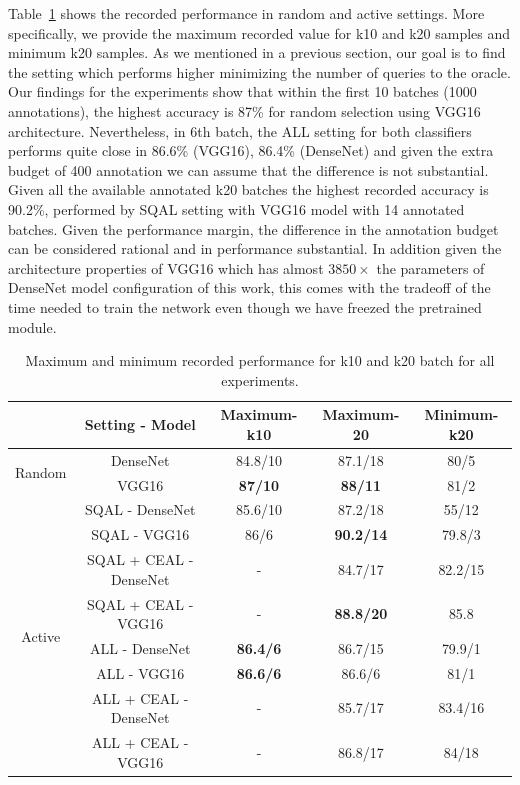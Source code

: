 Table~\ref{c5:table_experiment_performance_table} shows the recorded performance in random and active settings. More specifically, we provide the maximum recorded value for k10 and k20 samples and minimum k20 samples.
As we mentioned in a previous section, our goal is to find the setting which performs higher minimizing the number of queries to the oracle.
Our findings for the experiments show that within the first 10 batches (1000 annotations), the highest accuracy is 87\% for random selection using VGG16 architecture. Nevertheless, in 6th batch, the ALL setting for both classifiers performs quite close in 86.6\% (VGG16), 86.4\% (DenseNet) and given the extra budget of 400 annotation we can assume that the difference is not substantial.
Given all the available annotated k20 batches the highest recorded accuracy is 90.2\%, performed by SQAL setting with VGG16 model with 14 annotated batches. Given the performance margin, the difference in the annotation budget can be considered rational and in performance substantial. In addition given the architecture properties of VGG16 which has almost $3850\times$ the parameters of DenseNet model configuration of this work, this comes with the tradeoff of the time needed to train the network even though we have freezed the pretrained module.


\begin{table}[ht!]
\centering
\footnotesize
\begin{tabular}{c|c|c|c|c}

\multicolumn{1}{c|}{} & \multicolumn{1}{c|}{Setting - Model} & \multicolumn{1}{c|}{Maximum-k10} & \multicolumn{1}{c|}{Maximum-20} & \multicolumn{1}{c}{Minimum-k20} \\ \hline

\multirow{2}{*}{Random} & DenseNet & 84.8/10  & 87.1/18 & 80/5  \\
                        & VGG16    & \textbf{87/10}    & \textbf{88/11} & 81/2  \\ \hline

\multirow{8}{*}{Active} & SQAL - DenseNet & 85.6/10 & 87.2/18 & 55/12  \\
                        & SQAL - VGG16    & 86/6    & \textbf{90.2/14} & 79.8/3  \\ \cline{2-5}
                        & SQAL + CEAL - DenseNet & -& 84.7/17 & 82.2/15  \\ 
                        & SQAL + CEAL - VGG16 & - & \textbf{88.8/20} & 85.8   \\ \cline{2-5}
                        & ALL - DenseNet & \textbf{86.4/6} & 86.7/15 & 79.9/1 \\
                        & ALL - VGG16    & \textbf{86.6/6} & 86.6/6 & 81/1  \\ \cline{2-5}
                        & ALL + CEAL - DenseNet &- & 85.7/17 & 83.4/16   \\
                        & ALL + CEAL - VGG16 &- & 86.8/17 & 84/18  \\ \hline
\end{tabular}
\caption{Maximum and minimum recorded performance for k10 and k20  batch for all experiments.}
\label{c5:table_experiment_performance_table}
\end{table}

